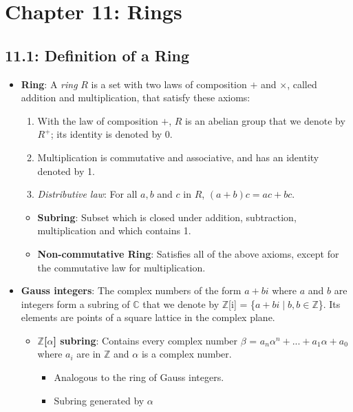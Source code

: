 \documentclass[12pt]{article}
\begin{document}
\section*{Chapter 11: Rings}

\subsection*{11.1: Definition of a Ring}
\begin{itemize}
  \item \textbf{Ring}: A \textit{ring} $R$ is a set with two laws of composition $+$ and $\times$, called addition and multiplication, that satisfy these axioms:
  \begin{enumerate}
    \begin{enumerate}
      \item With the law of composition $+$, $R$ is an abelian group that we denote by $R^+$; its identity is denoted by 0.
      \item Multiplication is commutative and associative, and has an identity denoted by 1.
      \item \textit{Distributive law}: For all $a, b$ and $c$ in $R$, $(a + b)c = ac + bc$.
    \end{enumerate}
  \end{enumerate}
  \begin{itemize}
    \item \textbf{Subring}: Subset which is closed under addition, subtraction, multiplication and which contains 1.
    \item \textbf{Non-commutative Ring}: Satisfies all of the above axioms, except for the commutative law for multiplication.
  \end{itemize}
  \item \textbf{Gauss integers}: The complex numbers of the form $a + bi$ where $a$ and $b$ are integers form a subring of $\mathbb{C}$ that we denote by $\mathbb{Z}$[i] = \{$a + bi \mid b, b \in \mathbb{Z}$\}. Its elements are points of a square lattice in the complex plane.
  \begin{itemize}
    \item \textbf{$\mathbb{Z}$[$\alpha$] subring}: Contains every complex number $\beta$ = $a_n\alpha^n + ... + a_1\alpha + a_0$ where $a_i$ are in $\mathbb{Z}$ and $\alpha$ is a complex number.
    \begin{itemize}
      \item Analogous to the ring of Gauss integers.
      \item Subring generated by $\alpha$

\end{itemize}
\end{itemize}
\end{itemize}
\end{document}

